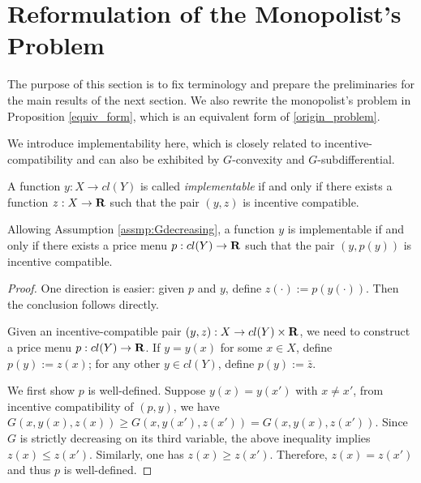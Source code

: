 \bigskip



\section{Reformulation of the Monopolist's Problem}\label{section:preliminary}


The purpose of this section is to fix terminology and prepare the preliminaries for the main results of the next section. We also rewrite the monopolist's problem in Proposition \ref{equiv_form}, which is an equivalent form of \eqref{origin_problem}. \medskip


{We introduce implementability here, which is closely related to incentive-compatibility and can also be exhibited by $G$-convexity and $G$-subdifferential. %
	
\begin{definition}[implementability]
		A function $y: X \rightarrow cl(Y)$ is called \textit{implementable} if and only if there exists a function $z: X \rightarrow {\mathbf R}$  such that the pair $(y, z)$ is incentive compatible.
\end{definition}

\begin{remark}\label{rmk:implementability}
	Allowing Assumption \ref{assmp:Gdecreasing}, a function $y$ is implementable if and only if there exists a price menu $p: cl(Y) \rightarrow {\mathbf R}$ such that the pair $(y, p(y))$ is incentive compatible.
\end{remark}

\begin{proof}%
	One direction is easier: given $p$ and $y$, define $z(\cdot):= p(y(\cdot))$. Then the conclusion follows directly.
	
	Given an incentive-compatible pair $(y, z): X \rightarrow cl(Y) \times {\mathbf R}$, we need to construct a price menu $p: cl(Y)\rightarrow {\mathbf R}$. If $y= y(x)$ for some $x\in X$, define $p(y):= z(x)$; for any other $y \in cl(Y)$, define $p(y) := \bar{z}$. \medskip
	
	We first show $p$ is well-defined. Suppose $y(x) = y(x')$ with $x\ne x'$, from incentive compatibility of $(p,y)$, we have $G(x,y(x), z(x)) \ge G(x, y(x'), z(x')) = G(x, y(x), z(x'))$. Since $G$ is strictly decreasing on its third variable, the above inequality implies $z(x) \le z(x')$. Similarly, one has $z(x) \ge z(x')$. Therefore, $z(x) = z(x')$ and thus $p$ is well-defined.
	

\end{proof}}
